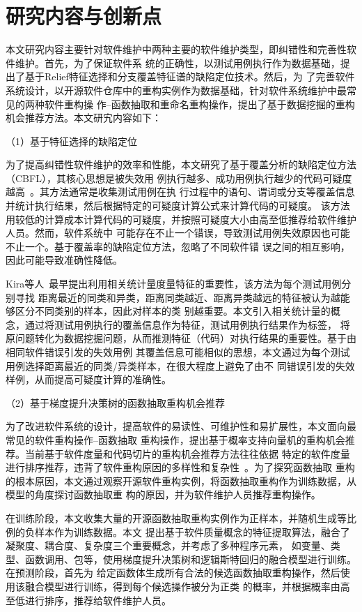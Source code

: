 \section{研究内容与创新点}
本文研究内容主要针对软件维护中两种主要的软件维护类型，即纠错性和完善性软件维护。首先，为了保证软件系
统的正确性，以测试用例执行作为数据基础，提出了基于Relief特征选择和分支覆盖特征谱的缺陷定位技术。然后，为
了完善软件系统设计，以开源软件仓库中的重构实例作为数据基础，针对软件系统维护中最常见的两种软件重构操
作--函数抽取和重命名重构操作，提出了基于数据挖掘的重构机会推荐方法。本文研宄内容如下：

（1）基于特征选择的缺陷定位

为了提高纠错性软件维护的效率和性能，本文研究了基于覆盖分析的缺陷定位方法（CBFL），其核心思想是被失效用
例执行越多、成功用例执行越少的代码可疑度越高~\cite{jones2005empirical}。其方法通常是收集测试用例在执
行过程中的语句、谓词或分支等覆盖信息并统计执行结果，然后根据特定的可疑度计算公式来计算代码的可疑度。
该方法用较低的计算成本计算代码的可疑度，并按照可疑度大小由高至低推荐给软件维护人员。然而，软件系统中
可能存在不止一个错误，导致测试用例失效原因也可能不止一个。基于覆盖率的缺陷定位方法，忽略了不同软件错
误之间的相互影响，因此可能导致准确性降低。

Kira等人~\cite{kira1992feature}最早提出利用相关统计量度量特征的重要性，该方法为每个测试用例分别寻找
距离最近的同类和异类，距离同类越近、距离异类越远的特征被认为越能够区分不同类别的样本，因此对样本的类
别越重要。本文引入相关统计量的概念，通过将测试用例执行的覆盖信息作为特征，测试用例执行结果作为标签，
将原问题转化为数据挖掘问题，从而推测特征（代码）对执行结果的重要性。基于由相同软件错误引发的失效用例
其覆盖信息可能相似的思想，本文通过为每个测试用例选择距离最近的同类/异类样本，在很大程度上避免了由不
同错误引发的失效样例，从而提高可疑度计算的准确性。

（2）基于梯度提升决策树的函数抽取重构机会推荐

为了改进软件系统的设计，提高软件的易读性、可维护性和易扩展性，本文面向最常见的软件重构操作--函数抽取
重构操作，提出基于概率支持向量机的重构机会推荐。当前基于软件度量和代码切片的重构机会推荐方法往往依据
特定的软件度量进行排序推荐，违背了软件重构原因的多样性和复杂性~\cite{silva2016we}。为了探究函数抽取
重构的根本原因，本文通过观察开源软件重构实例，将函数抽取重构作为训练数据，从模型的角度探讨函数抽取重
构的原因，并为软件维护人员推荐重构操作。

在训练阶段，本文收集大量的开源函数抽取重构实例作为正样本，并随机生成等比例的负样本作为训练数据。本文
提出基于软件质量概念的特征提取算法，融合了凝聚度、耦合度、复杂度三个重要概念，并考虑了多种程序元素，
如变量、类型、函数调用、包等，使用梯度提升决策树和逻辑斯特回归的融合模型进行训练。在预测阶段，首先为
给定函数体生成所有合法的候选函数抽取重构操作，然后使用该融合模型进行训练，得到每个候选操作被分为正类
的概率，并根据概率由高至低进行排序，推荐给软件维护人员。

